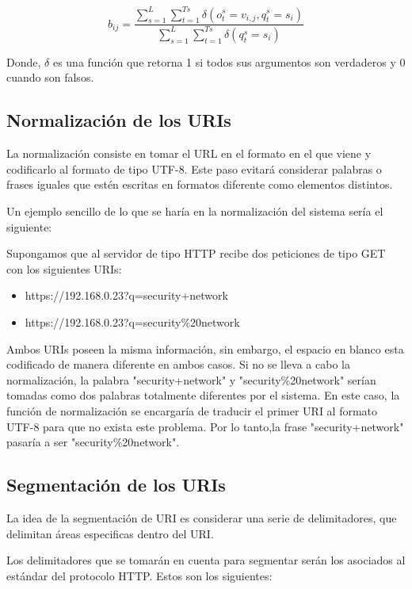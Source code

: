 \begin{equation}\label{eq:entrenamiento}
b_{ij} = \frac{\sum_{s=1}^{L}\sum_{t=1}^{Ts}\delta(o_{t}^{s} = v_{i,j} ,q_{t}^{s} = s_{i} )}{\sum_{s=1}^{L}\sum_{t=1}^{Ts}\delta(q_{t}^{s} = s_{i}) }
\end{equation}

Donde, $\delta$ es una función que retorna 1 si todos sus argumentos son verdaderos y 0 cuando son falsos.

\subsection*{Normalización de los URIs}
\label{sec:normalizacion}

La normalización consiste en tomar el URL en el formato en el que viene y codificarlo al formato de tipo UTF-8. Este paso evitará considerar palabras o frases iguales que estén escritas en formatos diferente como elementos distintos. 

Un ejemplo sencillo de lo que se haría en la normalización del sistema sería el siguiente:

Supongamos que al servidor de tipo HTTP recibe dos peticiones de tipo GET con los siguientes URIs:

\begin{itemize}
\item https://192.168.0.23?q=security+network
\item https://192.168.0.23?q=security\%20network
\end{itemize}
Ambos URIs poseen la misma información, sin embargo, el espacio en blanco esta codificado de manera diferente en ambos casos. Si no se lleva a cabo la normalización, la palabra "security+network" y "security\%20network" serían tomadas como dos palabras totalmente diferentes por el sistema. En este caso, la función de normalización se encargaría de traducir el primer URI al formato UTF-8 para que no exista este problema. Por lo tanto,la frase "security+network" pasaría a ser  "security\%20network".


\subsection*{Segmentación de los URIs}
\label{sec:delimitadores}

La idea de la segmentación de URI es considerar una serie de delimitadores, que delimitan áreas especificas dentro del URI.

Los delimitadores que se tomarán en cuenta para segmentar serán los asociados al estándar del protocolo HTTP. Estos son los siguientes:

